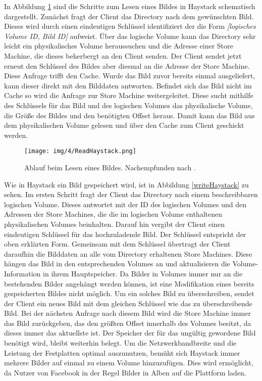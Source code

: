 \documentclass[12pt,oneside,a4paper,parskip]{scrbook}
\begin{document}
In Abbildung \ref{readHaystack} sind die Schritte zum Lesen eines Bildes in Haystack schematisch dargestellt. Zunächst fragt der Client das Directory nach dem gewünschten Bild. Dieses wird durch einen eindeutigen Schlüssel identifiziert der die Form \textit{[logisches Volume ID, Bild ID]} aufweist. Über das logische Volume kann das Directory sehr leicht ein physikalisches Volume heraussuchen und die Adresse einer Store Machine, die dieses beherbergt an den Client senden. Der Client sendet jetzt erneut den Schlüssel des Bildes aber diesmal an die Adresse der Store Machine. Diese Anfrage trifft den Cache. Wurde das Bild zuvor bereits einmal ausgeliefert, kann dieser direkt mit den Bilddaten antworten. Befindet sich das Bild nicht im Cache so wird die Anfrage zur Store Machine weitergeleitet. Diese sucht mithilfe des Schlüssels für das Bild und des logischen Volumes das physikalische Volume, die Größe des Bildes und den benötigten Offset heraus. Damit kann das Bild aus dem physikalischen Volume gelesen und über den Cache zum Client geschickt werden. 

\begin{figure}[h]
  \centering
  \texttt{[image: img/4/ReadHaystack.png]}
  \caption[Ablauf beim Lesen eines Bildes.]{ Ablauf beim Lesen eines Bildes. Nachempfunden nach \cite{haystack}.}
  \label{readHaystack}
\end{figure}

Wie in Haystack ein Bild gespeichert wird, ist in Abbildung \ref{writeHaystack} zu sehen. Im ersten Schritt fragt der Client das Directory nach einem beschreibbaren logischen Volume. Dieses antwortet mit der ID des logischen Volumes und den Adressen der Store Machines, die die im logischen Volume enthaltenen physikalischen Volumes beinhalten. Darauf hin vergibt der Client einen eindeutigen Schlüssel für das hochzuladende Bild. Der Schlüssel entspricht der oben erklärten Form. Gemeinsam mit dem Schlüssel übertragt der Client daraufhin die Bilddaten an alle vom Directory erhaltenen Store Machines. Diese hängen das Bild in den entsprechenden Volumes an und aktualisieren die Volume-Information in ihrem Hauptspeicher. Da Bilder in Volumes immer nur an die bestehenden Bilder angehängt werden können, ist eine Modifikation eines bereits gespeicherten Bildes nicht möglich. Um ein solches Bild zu überschreiben, sendet der Client ein neues Bild mit dem gleichen Schlüssel wie das zu überschreibende Bild. Bei der nächsten Anfrage nach diesem Bild wird die Store Machine immer das Bild zurückgeben, das den größten Offset innerhalb des Volumes besitzt, da dieses immer das aktuellste ist. Der Speicher der für das ungültig gewordene Bild benötigt wird, bleibt weiterhin belegt. Um die Netzwerkbandbreite und die Leistung der Festplatten optimal auszunutzen, bemüht sich Haystack immer mehrere Bilder auf einmal zu einem Volume hinzuzufügen. Dies wird ermöglicht, da Nutzer von Facebook in der Regel Bilder in Alben auf die Plattform laden.
\end{document}
